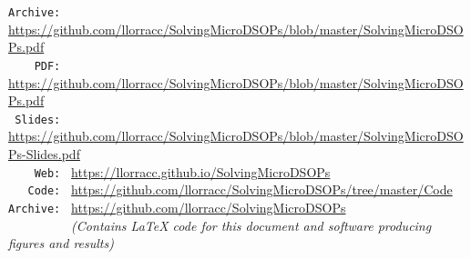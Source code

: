 \documentclass[titlepage]{\econtex}
\begin{document}
\begin{footnotesize}
\parbox{\textwidth}{
\begin{center}
\begin{tabbing}
  \texttt{Archive:~} \= \= \url{https://github.com/llorracc/SolvingMicroDSOPs/blob/master/SolvingMicroDSOPs.pdf}  \kill \\  %
\texttt{~~~~PDF:~} \> \> \url{https://github.com/llorracc/SolvingMicroDSOPs/blob/master/SolvingMicroDSOPs.pdf} \\
\texttt{~Slides:~} \> \> \url{https://github.com/llorracc/SolvingMicroDSOPs/blob/master/SolvingMicroDSOPs-Slides.pdf} \\
\texttt{~~~~Web:~} \> \> \url{https://llorracc.github.io/SolvingMicroDSOPs} \\
\texttt{~~~Code:~} \> \> \url{https://github.com/llorracc/SolvingMicroDSOPs/tree/master/Code} \\
\texttt{Archive:~} \> \> \url{https://github.com/llorracc/SolvingMicroDSOPs}\\ 
\texttt{~~~~~~~~~} \> \> \textit{(Contains LaTeX code for this document and software producing figures and results)}
\end{tabbing}
\end{center}
}
\end{footnotesize}

\begin{authorsinfo}
\end{authorsinfo}
\end{document}
